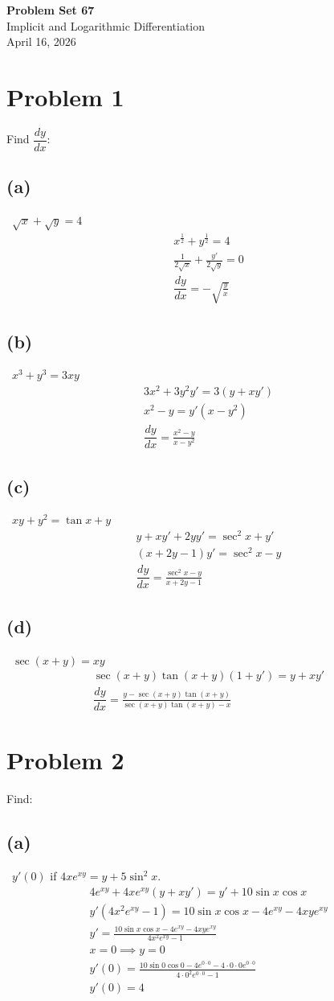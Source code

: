 \documentclass[12pt]{article}
\newcommand{\dydx}{\dfrac{dy}{dx}}
\newcommand{\vem}{\vspace{0.5em}}
\newcommand{\problem}[1]{\section{Problem #1}}
\newcommand{\subproblem}[1]{\subsection{(#1)} \,}
\begin{document}
\vspace*{0cm}

\begin{center}
    {\Large \bfseries Problem Set 67} \\[0.5cm]
    {\large Implicit and Logarithmic Differentiation} \\[0.35cm]
    {\normalsize April 16, 2026}
\end{center}


\problem{1}
Find $\dydx:$ \vem 

\subproblem{a} $\sqrt{x}+\sqrt{y}=4$
\begin{gather*}
    x^\frac{1}{2}+y^\frac{1}{2}=4\\
    \frac{1}{2\sqrt{x}}+\frac{y'}{2\sqrt{y}}=0\\
    \boxed{\dydx =-\sqrt{\frac{y}{x}}}
\end{gather*}

\subproblem{b} $x^3+y^3=3xy$
\begin{gather*}
    3x^2+3y^2y'=3(y+xy')\\
    x^2-y=y'(x-y^2)\\
    \boxed{\dydx =\frac{x^2-y}{x-y^2}}
\end{gather*}

\subproblem{c} $xy+y^2=\tan x+y$\\
\begin{gather*}
    y+xy'+2yy'=\sec^2x+y'\\
    (x+2y-1)y'=\sec^2 x-y\\
    \boxed{\dydx = \frac{\sec^2 x-y}{x+2y-1}}
\end{gather*}

\subproblem{d} $\sec (x+y)=xy$
\begin{gather*}
    \sec (x+y)\tan (x+y)(1+y')=y+xy'\\
    \boxed{\dydx = \frac{y-\sec (x+y)\tan (x+y)}{\sec (x+y)\tan (x+y)-x}}
\end{gather*}

\problem{2}
Find: \vem 

\subproblem{a} $y'(0)$ if $4xe^{xy}=y+5\sin^2 x$.
\begin{gather*}
    4e^{xy}+4x e^{xy} (y+xy')=y'+10\sin x \cos x\\
    y'(4x^2e^{xy}-1)=10\sin x\cos x-4e^{xy}-4xye^{xy}\\
    y'=\frac{10\sin x\cos x-4e^{xy}-4xye^{xy}}{4x^2e^{xy}-1}\\
    x=0 \implies y=0\\
    y'(0)=\frac{10\sin 0\cos 0-4e^{0 \cdot 0}-4\cdot 0\cdot 0 e^{0\cdot 0}}{4\cdot 0^2e^{0 \cdot 0}-1}\\
    \boxed{y'(0)=4}
\end{gather*}
\end{document}
